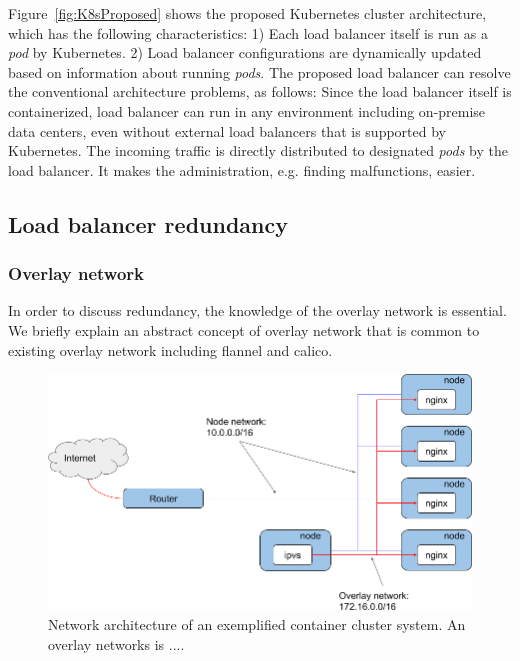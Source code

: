 Figure~\ref{fig:K8sProposed} shows the proposed  Kubernetes cluster architecture, 
which has the following characteristics:
1) Each load balancer itself is run as a {\em pod} by Kubernetes. 
2) Load balancer configurations are dynamically updated based on information about running {\em pods}.
The proposed load balancer can resolve the conventional architecture problems, as follows:
Since the load balancer itself is containerized, load balancer can run in any environment including on-premise data centers, 
even without external load balancers that is supported by Kubernetes.
The incoming traffic is directly distributed to designated {\em pods} by the load balancer. 
It makes the administration, e.g. finding malfunctions, easier.

\subsection{Load balancer redundancy}

\subsubsection{Overlay network}

In order to discuss redundancy, the knowledge of the overlay network is essential.
We briefly explain an abstract concept of overlay network that is common to existing overlay network including flannel\cite{coreos_2018} and calico\cite{project_calico}.

\begin{figure}[tb]
\begin{center}
\includegraphics[width=\columnwidth]{Figs/overlay.png}
\end{center}
\caption{Network architecture of an exemplified container cluster system. An overlay networks is .... }
\label{fig:overlay}
\end{figure}

